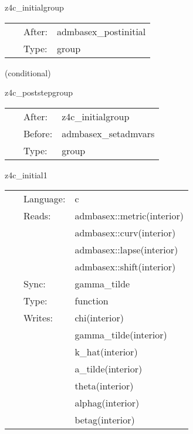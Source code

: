 
\hspace{5mm} z4c\_initialgroup 

\hspace{5mm}{\it convert adm to z4c variables } 


\hspace{5mm}

 \begin{tabular*}{160mm}{cll} 
~ & After:  & admbasex\_postinitial \\ 
~ & Type:  & group \\ 
\end{tabular*} 


\vspace{5mm}

   (conditional) 

\hspace{5mm} z4c\_poststepgroup 

\hspace{5mm}{\it post-process z4c variables } 


\hspace{5mm}

 \begin{tabular*}{160mm}{cll} 
~ & After:  & z4c\_initialgroup \\ 
~ & Before:  & admbasex\_setadmvars \\ 
~ & Type:  & group \\ 
\end{tabular*} 


\vspace{5mm}


\hspace{5mm} z4c\_initial1 

\hspace{5mm}{\it convert adm to z4c variables, part 1 } 


\hspace{5mm}

 \begin{tabular*}{160mm}{cll} 
~ & Language:  & c \\ 
~ & Reads:  & admbasex::metric(interior) \\ 
~& ~ &admbasex::curv(interior)\\ 
~& ~ &admbasex::lapse(interior)\\ 
~& ~ &admbasex::shift(interior)\\ 
~ & Sync:  & gamma\_tilde \\ 
~ & Type:  & function \\ 
~ & Writes:  & chi(interior) \\ 
~& ~ &gamma\_tilde(interior)\\ 
~& ~ &k\_hat(interior)\\ 
~& ~ &a\_tilde(interior)\\ 
~& ~ &theta(interior)\\ 
~& ~ &alphag(interior)\\ 
~& ~ &betag(interior)\\ 
\end{tabular*} 


